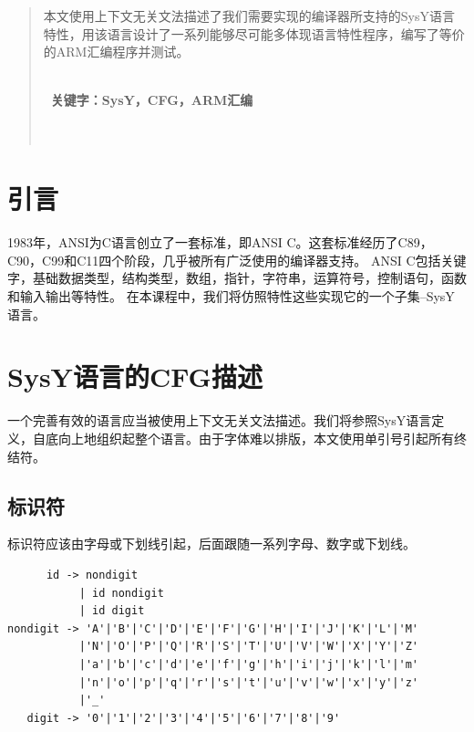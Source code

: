 \documentclass[UTF8,a4paper,10pt]{ctexart}
\newcommand{\sihao}{\fontsize{14pt}{21pt}\selectfont}            %
\begin{document}
\newpage
\thispagestyle{empty}
\renewcommand{\abstractname}{\kaishu \sihao \textbf{摘要}}
    \begin{abstract}
        本文使用上下文无关文法描述了我们需要实现的编译器所支持的SysY语言特性，用该语言设计了一系列能够尽可能多体现语言特性程序，编写了等价的ARM汇编程序并测试。

        \noindent  %
        \textbf{\\\ 关键字：SysY，CFG，ARM汇编}\textbf{} \\\ \\\
    \end{abstract}
\tableofcontents
\newpage
\setcounter{page}{1}

\section{引言}
    1983年，ANSI为C语言创立了一套标准，即ANSI C。这套标准经历了C89，C90，C99和C11四个阶段，几乎被所有广泛使用的编译器支持。
    ANSI C包括关键字，基础数据类型，结构类型，数组，指针，字符串，运算符号，控制语句，函数和输入输出等特性。
    在本课程中，我们将仿照特性这些实现它的一个子集--SysY语言。
    
\section{SysY语言的CFG描述}
    一个完善有效的语言应当被使用上下文无关文法描述。我们将参照SysY语言定义，自底向上地组织起整个语言。由于字体难以排版，本文使用单引号引起所有终结符。

    \subsection{标识符}
    标识符应该由字母或下划线引起，后面跟随一系列字母、数字或下划线。
    \begin{lstlisting}
      id -> nondigit
           | id nondigit
           | id digit
nondigit -> 'A'|'B'|'C'|'D'|'E'|'F'|'G'|'H'|'I'|'J'|'K'|'L'|'M'
           |'N'|'O'|'P'|'Q'|'R'|'S'|'T'|'U'|'V'|'W'|'X'|'Y'|'Z'
           |'a'|'b'|'c'|'d'|'e'|'f'|'g'|'h'|'i'|'j'|'k'|'l'|'m'
           |'n'|'o'|'p'|'q'|'r'|'s'|'t'|'u'|'v'|'w'|'x'|'y'|'z'
           |'_'
   digit -> '0'|'1'|'2'|'3'|'4'|'5'|'6'|'7'|'8'|'9'
    \end{lstlisting}
\end{document}
